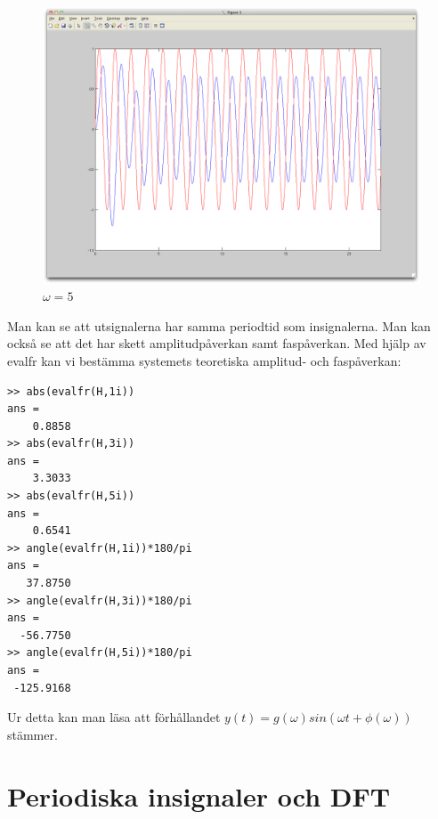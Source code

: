 \documentclass[]{article}
\begin{document}
\begin{figure}[htb]
  \centering
  \includegraphics[width=15.0cm]{omega 5.png}
  \caption{$\omega = 5$}
\end{figure}
Man kan se att utsignalerna har samma periodtid som insignalerna. Man kan också se att det har skett amplitudpåverkan samt faspåverkan.
Med hjälp av evalfr kan vi bestämma systemets teoretiska amplitud- och faspåverkan:
\begin{verbatim}
>> abs(evalfr(H,1i))
ans =
    0.8858
>> abs(evalfr(H,3i))
ans =
    3.3033
>> abs(evalfr(H,5i))
ans =
    0.6541
>> angle(evalfr(H,1i))*180/pi
ans =
   37.8750
>> angle(evalfr(H,3i))*180/pi
ans =
  -56.7750
>> angle(evalfr(H,5i))*180/pi
ans =
 -125.9168
\end{verbatim}

Ur detta kan man läsa att förhållandet $y(t) = g(\omega) sin(\omega t + \phi (\omega))$ stämmer.

\section{Periodiska insignaler och DFT}
\end{document}
